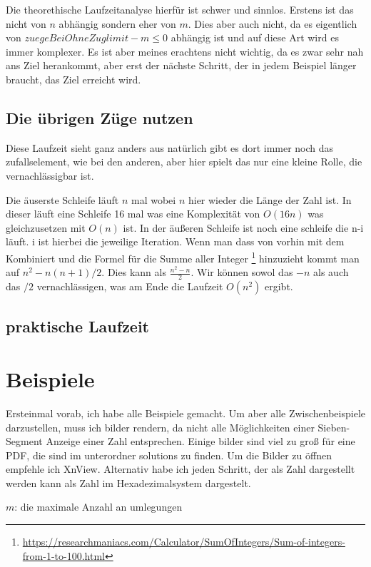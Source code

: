 \documentclass[a4paper,10pt,ngerman]{scrartcl}
\begin{document}
Die theorethische Laufzeitanalyse hierfür ist schwer und sinnlos. Erstens ist das nicht von $n$ abhängig sondern eher von $m$. Dies aber auch nicht, da es eigentlich von $zuegeBeiOhneZuglimit - m \leq 0$ abhängig ist und auf diese Art wird es immer komplexer. Es ist aber meines erachtens nicht wichtig, da es zwar sehr nah ans Ziel herankommt, aber erst der nächste Schritt, der in jedem Beispiel länger braucht, das Ziel erreicht wird.

\subsection{Die übrigen Züge nutzen}

Diese Laufzeit sieht ganz anders aus natürlich gibt es dort immer noch das zufallselement, wie bei den anderen, aber hier spielt das nur eine kleine Rolle, die vernachlässigbar ist.

Die äuserste Schleife läuft $n$ mal wobei $n$ hier wieder die Länge der Zahl ist. In dieser läuft eine Schleife 16 mal was eine Komplexität von $O(16n)$ was gleichzusetzen mit $O(n)$ ist. In der äußeren Schleife ist noch eine schleife die n-i läuft. i ist hierbei die jeweilige Iteration. 
Wenn man dass von vorhin mit dem Kombiniert und die Formel für die Summe aller Integer \footnote{\url{https://researchmaniacs.com/Calculator/SumOfIntegers/Sum-of-integers-from-1-to-100.html}} hinzuzieht kommt man auf $n^2 - n(n+1)/2$. Dies kann als $\frac{n^2 - n}{2}$. Wir können sowol das $-n$ als auch das $/2$ vernachlässigen, was am Ende die Laufzeit $O(n^2)$ ergibt.

\subsection{praktische Laufzeit}


\section{Beispiele}

Ersteinmal vorab, ich habe alle Beispiele gemacht. Um aber alle Zwischenbeispiele darzustellen, muss ich bilder rendern, da nicht alle Möglichkeiten einer Sieben-Segment Anzeige einer Zahl entsprechen. Einige bilder sind viel zu groß für eine PDF, die sind im unterordner solutions zu finden. Um die Bilder zu öffnen empfehle ich XnView. Alternativ habe ich jeden Schritt, der als Zahl dargestellt werden kann als Zahl im Hexadezimalsystem dargestelt.

\noindent $m$: die maximale Anzahl an umlegungen
\end{document}
